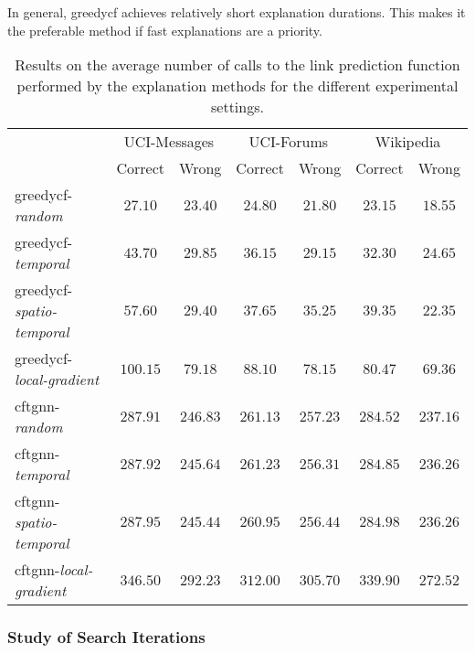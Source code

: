In general, \gls{greedycf} achieves relatively short explanation durations. This makes it the preferable method if fast explanations are a priority.

\begin{table}
    \centering
    \small
    \begin{tabular}{lcccccc}
    \hline
         &  \multicolumn{2}{c}{UCI-Messages}&  \multicolumn{2}{c}{UCI-Forums}&  \multicolumn{2}{c}{Wikipedia}\\
         &  Correct&  Wrong&  Correct&  Wrong&  Correct& Wrong\\
         \hline
         \gls{greedycf}-\textit{random}&  $27.10$&  $23.40$&  $24.80$&  $21.80$&  $23.15$& $18.55$\\
         \gls{greedycf}-\textit{temporal}&  $43.70$&  $29.85$&  $36.15$&  $29.15$&  $32.30$& $24.65$\\
         \gls{greedycf}-\textit{spatio-temporal}&  $57.60$&  $29.40$&  $37.65$&  $35.25$&  $39.35$& $22.35$\\
         \gls{greedycf}-\textit{local-gradient}&  $100.15$&  $79.18$&  $88.10$&  $78.15$&  $80.47$& $69.36$\\
         \gls{cftgnn}-\textit{random}&  $287.91$&  $246.83$&  $261.13$&  $257.23$&  $284.52$& $237.16$\\
         \gls{cftgnn}-\textit{temporal}&  $287.92$&  $245.64$&  $261.23$&  $256.31$&  $284.85$& $236.26$\\
         \gls{cftgnn}-\textit{spatio-temporal}&  $287.95$&  $245.44$&  $260.95$&  $256.44$&  $284.98$& $236.26$\\
 \gls{cftgnn}-\textit{local-gradient}& $346.50$& $292.23$& $312.00$& $305.70$& $339.90$&$272.52$\\
 \hline
    \end{tabular}
    \caption{Results on the average number of calls to the link prediction function performed by the explanation methods for the different experimental settings.}
    \label{t_oracle_calls}
\end{table}

\FloatBarrier
\subsubsection{Study of Search Iterations}
\label{s_Evaluation_Results_Iterations}

